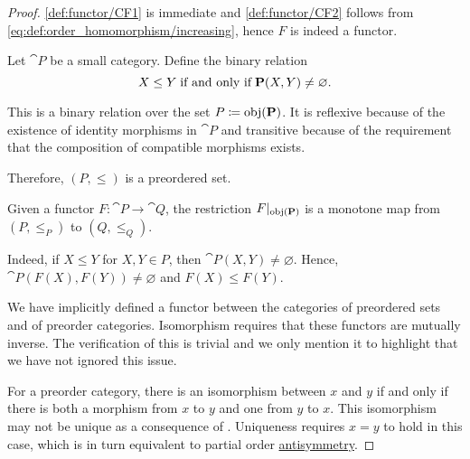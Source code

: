 \begin{proof}
  \ref{def:functor/CF1} is immediate and \ref{def:functor/CF2} follows from \eqref{eq:def:order_homomorphism/increasing}, hence \( F \) is indeed a functor.

   Let \( \cat{P} \) be a small category. Define the binary relation
  \begin{equation*}
    X \leq Y \T{if and only if} \cat{P}(X, Y) \neq \varnothing.
  \end{equation*}

  This is a binary relation over the set \( P \coloneqq \operatorname{obj}(\operatorname{\mathbf{P}}) \). It is reflexive because of the existence of identity morphisms in \( \cat{P} \) and transitive because of the requirement that the composition of compatible morphisms exists.

  Therefore, \( (P, \leq) \) is a preordered set.

  Given a functor \( F: \cat{P} \to \cat{Q} \), the restriction \( F\vert_{\operatorname{obj}(\operatorname{\mathbf{P}})} \) is a monotone map from \( (P, \leq_P) \) to \( (Q, \leq_Q) \).

  Indeed, if \( X \leq Y \) for \( X, Y \in P \), then \( \cat{P}(X, Y) \neq \varnothing \). Hence, \( \cat{P}(F(X), F(Y)) \neq \varnothing \) and \( F(X) \leq F(Y) \).

   We have implicitly defined a functor between the categories of preordered sets and of preorder categories. Isomorphism requires that these functors are mutually inverse. The verification of this is trivial and we only mention it to highlight that we have not ignored this issue.

   For a preorder category, there is an isomorphism between \( x \) and \( y \) if and only if there is both a morphism from \( x \) to \( y \) and one from \( y \) to \( x \). This isomorphism may not be unique as a consequence of . Uniqueness requires \( x = y \) to hold in this case, which is in turn equivalent to partial order \hyperref[def:binary_relation/antisymmetric]{antisymmetry}.
\end{proof}

